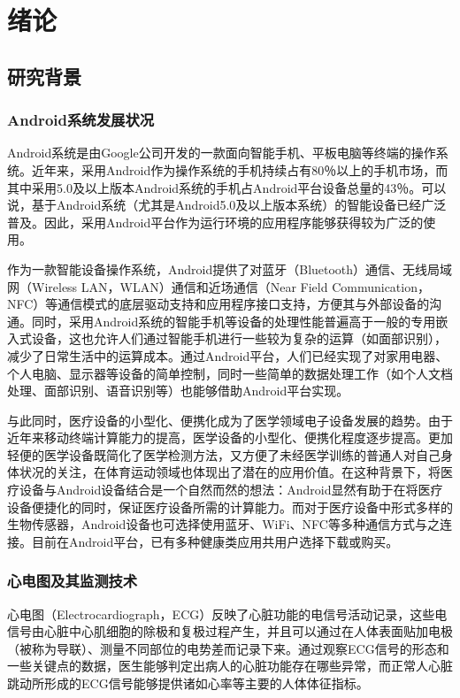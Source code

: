 \section{绪论}
\subsection{研究背景}
\subsubsection{Android系统发展状况}

Android系统是由Google公司开发的一款面向智能手机、平板电脑等终端的操作系统。近年来，采用Android作为操作系统的手机持续占有80％以上的手机市场\cite{idc_research_inc_smartphone_????}，而其中采用5.0及以上版本Android系统的手机占Android平台设备总量的43％\cite{statista_inc_android_????}。可以说，基于Android系统（尤其是Android5.0及以上版本系统）的智能设备已经广泛普及。因此，采用Android平台作为运行环境的应用程序能够获得较为广泛的使用。

作为一款智能设备操作系统，Android提供了对蓝牙（Bluetooth）通信、无线局域网（Wireless LAN，WLAN）通信和近场通信（Near Field Communication，NFC）等通信模式的底层驱动支持和应用程序接口支持，方便其与外部设备的沟通\cite{yaghmour_embedded_2013}。同时，采用Android系统的智能手机等设备的处理性能普遍高于一般的专用嵌入式设备，这也允许人们通过智能手机进行一些较为复杂的运算（如面部识别），减少了日常生活中的运算成本。通过Android平台，人们已经实现了对家用电器、个人电脑、显示器等设备的简单控制，同时一些简单的数据处理工作（如个人文档处理、面部识别、语音识别等）也能够借助Android平台实现。

与此同时，医疗设备的小型化、便携化成为了医学领域电子设备发展的趋势。由于 近年来移动终端计算能力的提高，医学设备的小型化、便携化程度逐步提高。更加轻便的医学设备既简化了医学检测方法，又方便了未经医学训练的普通人对自己身体状况的关注，在体育运动领域也体现出了潜在的应用价值\cite{moreno_android_2012}。在这种背景下，将医疗设备与Android设备结合是一个自然而然的想法：Android显然有助于在将医疗设备便捷化的同时，保证医疗设备所需的计算能力。而对于医疗设备中形式多样的生物传感器，Android设备也可选择使用蓝牙、WiFi、NFC等多种通信方式与之连接。目前在Android平台，已有多种健康类应用共用户选择下载或购买。

\subsubsection{心电图及其监测技术}

心电图（Electrocardiograph，ECG）反映了心脏功能的电信号活动记录，这些电信号由心脏中心肌细胞的除极和复极过程产生，并且可以通过在人体表面贴加电极（被称为导联）、测量不同部位的电势差而记录下来\cite{moreno_android_2012}\cite{_zhenduanxue_2013}。通过观察ECG信号的形态和一些关键点的数据，医生能够判定出病人的心脏功能存在哪些异常，而正常人心脏跳动所形成的ECG信号能够提供诸如心率等主要的人体体征指标。

